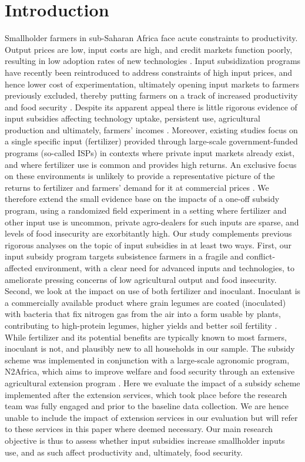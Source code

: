 \section{Introduction} 
Smallholder farmers in sub-Saharan Africa face acute constraints to productivity. Output prices are low, input costs are high, and credit markets function poorly, resulting in low adoption rates of new technologies \citep{Morris2007,Sheahan2014}. Input subsidization programs have recently been reintroduced to address constraints of high input prices, and hence lower cost of experimentation, ultimately opening input markets to farmers previously excluded, thereby putting farmers on a track of increased productivity and food security \citep{Denning2009,Dorward2004}. Despite its apparent appeal there is little rigorous evidence of input subsidies affecting technology uptake, persistent use, agricultural production and ultimately, farmers’ incomes \citep[but see][for recent work on this topic in Mozambique]{Carter2014,Carter2019}. Moreover, existing studies focus on a single specific input (fertilizer) provided through large-scale government-funded programs (so-called ISPs) in contexts where private input markets already exist, and where fertilizer use is common and provides high returns. An exclusive focus on these environments is unlikely to provide a representative picture of the returns to fertilizer and farmers’ demand for it at commercial prices \citep[also see][]{Jayne2018}. We therefore extend the small evidence base on the impacts of a one-off subsidy program, using a randomized field experiment in a setting where fertilizer and other input use is uncommon, private agro-dealers for such inputs are sparse, and levels of food insecurity are exorbitantly high. 
Our study complements previous rigorous analyses on the topic of input subsidies in at least two ways. First, our input subsidy program targets subsistence farmers in a fragile and conflict-affected environment, with a clear need for advanced inputs and technologies, to ameliorate pressing concerns of low agricultural output and food insecurity. Second, we look at the impact on use of both fertilizer and inoculant. Inoculant is a commercially available product where grain legumes are coated (inoculated) with bacteria that fix nitrogen gas from the air into a form usable by plants, contributing to high-protein legumes, higher yields and better soil fertility \citep{Woomer2014}. While fertilizer and its potential benefits are typically known to most farmers, inoculant is not, and plausibly new to all households in our sample. The subsidy scheme was implemented in conjunction with a large-scale agronomic program, N2Africa, which aims to improve welfare and food security through an extensive agricultural extension program \citep{Woomer2014}. Here we evaluate the impact of a subsidy scheme implemented after the extension services, which took place before the research team was fully engaged and prior to the baseline data collection. We are hence unable to include the impact of extension services in our evaluation but will refer to these services in this paper where deemed necessary. Our main research objective is thus to assess whether input subsidies increase smallholder inputs use, and as such affect productivity and, ultimately, food security. 

